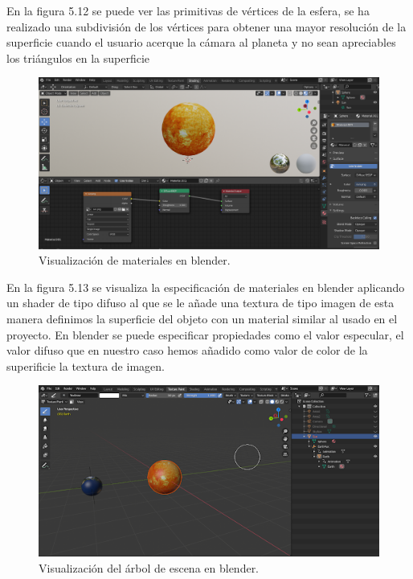 \documentclass[a4paper, 17pt]{book}
\begin{document}
En la figura 5.12 se puede ver las primitivas de vértices de la esfera, se ha realizado una subdivisión de los vértices para obtener una mayor
resolución de la superficie cuando el usuario acerque la cámara al planeta y no sean apreciables los triángulos en la superficie

\begin{figure}[H]
    \centering
    \includegraphics[scale=0.25, keepaspectratio]{img/MaterialBlender.png}
    \caption{Visualización de materiales en blender.}
    \label{figura:materialesBlender}
\end{figure}

En la figura 5.13 se visualiza la especificación de materiales en blender aplicando un shader de tipo difuso al que se le añade una
textura de tipo imagen de esta manera definimos la superficie del objeto con un material similar al usado en el proyecto. En blender
se puede especificar propiedades como el valor especular, el valor difuso que en nuestro caso hemos añadido como valor de color
de la superificie la textura de imagen.

\begin{figure}[H]
    \centering
    \includegraphics[scale=0.45, keepaspectratio]{img/SceneSolar.png}
    \caption{Visualización del árbol de escena en blender.}
    \label{figura:materialesBlender}
\end{figure}
\end{document}
